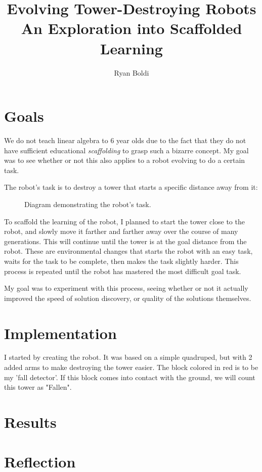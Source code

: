 \documentclass[12pt, a4paper]{article}
\title{Evolving Tower-Destroying Robots\\\normalsize An Exploration into Scaffolded Learning}
\author{Ryan Boldi}
\begin{document}
\maketitle
\tableofcontents
\newpage
\section{Goals}
We do not teach linear algebra to 6 year olds due to the fact that they do not have sufficient educational \emph{scaffolding} to grasp such a bizarre concept. My goal was to see whether or not this also applies to a robot evolving to do a certain task.\par 
The robot's task is to destroy a tower that starts a specific distance away from it:\par
\vspace{-10pt}
\begin{figure}[h]
\begin{center}
	\centering
{}
\caption{Diagram demonstrating the robot's task.}
\end{center}
\end{figure}
\vspace{-10pt}
To scaffold the learning of the robot, I planned to start the tower close to the robot, and slowly move it farther and farther away over the course of many generations. This will continue until the tower is at the goal distance from the robot. These are environmental changes that starts the robot with an easy task, waits for the task to be complete, then makes the task slightly harder. This process is repeated until the robot has mastered the most difficult goal task.\par
My goal was to experiment with this process, seeing whether or not it actually improved the speed of solution discovery, or quality of the solutions themselves.

\section{Implementation}
I started by creating the robot. It was based on a simple quadruped, but with 2 added arms to make destroying the tower easier.
The block colored in red is to be my 'fall detector'. If this block comes into contact with the ground, we will count this tower as "Fallen".
\section{Results}
\section{Reflection}
\end{document}
